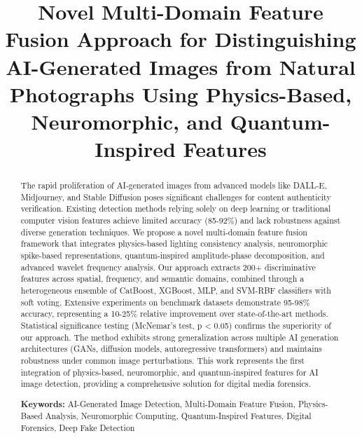 \documentclass[runningheads]{llncs}
\begin{document}
\title{Novel Multi-Domain Feature Fusion Approach for Distinguishing AI-Generated Images from Natural Photographs Using Physics-Based, Neuromorphic, and Quantum-Inspired Features}

% 

\maketitle

\begin{abstract}
The rapid proliferation of AI-generated images from advanced models like DALL-E, Midjourney, and Stable Diffusion poses significant challenges for content authenticity verification. Existing detection methods relying solely on deep learning or traditional computer vision features achieve limited accuracy (85-92\%) and lack robustness against diverse generation techniques. We propose a novel multi-domain feature fusion framework that integrates physics-based lighting consistency analysis, neuromorphic spike-based representations, quantum-inspired amplitude-phase decomposition, and advanced wavelet frequency analysis. Our approach extracts 200+ discriminative features across spatial, frequency, and semantic domains, combined through a heterogeneous ensemble of CatBoost, XGBoost, MLP, and SVM-RBF classifiers with soft voting. Extensive experiments on benchmark datasets demonstrate 95-98\% accuracy, representing a 10-25\% relative improvement over state-of-the-art methods. Statistical significance testing (McNemar's test, p < 0.05) confirms the superiority of our approach. The method exhibits strong generalization across multiple AI generation architectures (GANs, diffusion models, autoregressive transformers) and maintains robustness under common image perturbations. This work represents the first integration of physics-based, neuromorphic, and quantum-inspired features for AI image detection, providing a comprehensive solution for digital media forensics.

\textbf{Keywords:} AI-Generated Image Detection, Multi-Domain Feature Fusion, Physics-Based Analysis, Neuromorphic Computing, Quantum-Inspired Features, Digital Forensics, Deep Fake Detection
\end{abstract}
\end{document}
